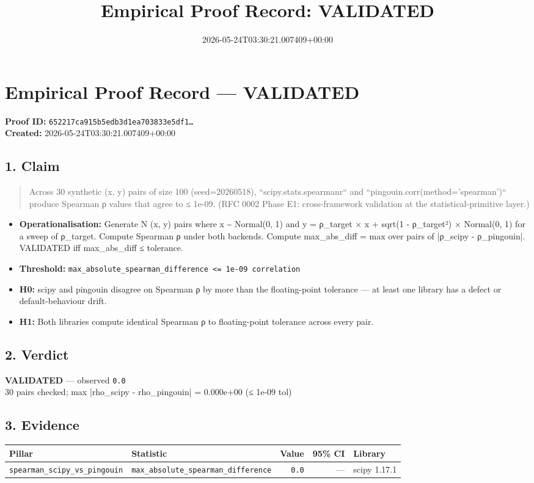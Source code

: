 \documentclass{article}
\title{Empirical Proof Record: VALIDATED}
\date{2026-05-24T03:30:21.007409+00:00}
\begin{document}
\maketitle
\section*{Empirical Proof Record --- \textcolor{validated}{\textbf{VALIDATED}}}
\textbf{Proof ID:} \texttt{652217ca915b5edb3d1ea703833e5df1\dots}\\
\textbf{Created:} 2026-05-24T03:30:21.007409+00:00
\subsection*{1. Claim}
\begin{quote}Across 30 synthetic (x, y) pairs of size 100 (seed=20260518), ``scipy.stats.spearmanr`` and ``pingouin.corr(method='spearman')`` produce Spearman ρ values that agree to ≤ 1e-09. (RFC 0002 Phase E1: cross-framework validation at the statistical-primitive layer.)\end{quote}
\begin{itemize}
\item \textbf{Operationalisation:} Generate N (x, y) pairs where x \textasciitilde{} Normal(0, 1) and y = ρ\_target × x + sqrt(1 - ρ\_target²) × Normal(0, 1) for a sweep of ρ\_target. Compute Spearman ρ under both backends. Compute max\_abs\_diff = max over pairs of |ρ\_scipy - ρ\_pingouin|. VALIDATED iff max\_abs\_diff ≤ tolerance.
\item \textbf{Threshold:} \texttt{max\_absolute\_spearman\_difference <= 1e-09 correlation}
\item \textbf{H0:} scipy and pingouin disagree on Spearman ρ by more than the floating-point tolerance — at least one library has a defect or default-behaviour drift.
\item \textbf{H1:} Both libraries compute identical Spearman ρ to floating-point tolerance across every pair.
\end{itemize}
\subsection*{2. Verdict}
\textcolor{validated}{\textbf{VALIDATED}} --- observed \texttt{0.0}\\
30 pairs checked; max |rho\_scipy - rho\_pingouin| = 0.000e+00 (≤ 1e-09 tol)
\subsection*{3. Evidence}
\begin{tabular}{llrrl}\toprule
\textbf{Pillar} & \textbf{Statistic} & \textbf{Value} & \textbf{95\% CI} & \textbf{Library} \\\midrule
\texttt{spearman\_scipy\_vs\_pingouin} & \texttt{max\_absolute\_spearman\_difference} & \texttt{0.0} & --- & scipy 1.17.1 \\
\bottomrule\end{tabular}
\end{document}
